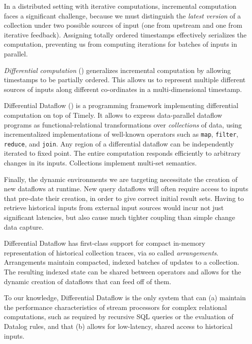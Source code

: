 \documentclass[../index.tex]{subfiles}
\begin{document}
In a distributed setting with iterative computations, incremental
computation faces a significant challenge, because we must distinguish
the \emph{latest version} of a collection under two possible sources
of input (one from upstream and one from iterative
feedback). Assigning totally ordered timestamps effectively serializes
the computation, preventing us from computing iterations for batches
of inputs in parallel.

\emph{Differential computation} (\cite{mcsherry2013differential})
generalizes incremental computation by allowing timestamps to be
partially ordered. This allows us to represent multiple different
sources of inputs along different co-ordinates in a multi-dimensional
timestamp.

Differential Dataflow (\cite{differential}) is a programming framework
implementing differential computation on top of Timely. It allows to
express data-parallel dataflow programs as functional-relational
transformations over \emph{collections} of data, using incrementalized
implementations of well-known operators such as \texttt{map},
\texttt{filter}, \texttt{reduce}, and \texttt{join}. Any region of a
differential dataflow can be independently iterated to fixed
point. The entire computation responds efficiently to arbitrary
changes in its inputs. Collections implement multi-set semantics.

Finally, the dynamic environments we are targeting necessitate the
creation of new dataflows at runtime. New query dataflows will often
require access to inputs that pre-date their creation, in order to
give correct initial result sets. Having to retrieve historical inputs
from external input sources would incur not just significant
latencies, but also cause much tighter coupling than simple change
data capture.

Differential Dataflow has first-class support for compact in-memory
representation of historical collection traces, via so called
\emph{arrangements}. Arrangements maintain compacted, indexed batches
of updates to a collection. The resulting indexed state can be shared
between operators and allows for the dynamic creation of dataflows
that can feed off of them.

To our knowledge, Differential Dataflow is the only system that can
(a) maintain the performance characteristics of stream processors for
complex relational computations, such as required by recursive SQL
queries or the evaluation of Datalog rules, and that (b) allows for
low-latency, shared access to historical inputs.
\end{document}

